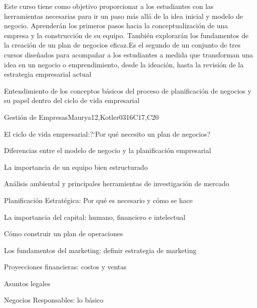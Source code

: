 \begin{syllabus}


\begin{justification}
Este curso tiene como objetivo proporcionar a los estudiantes con las herramientas necesarias para ir un paso más allá de la idea inicial y modelo de negocio. Aprenderán los primeros pasos hacia la conceptualización de una empresa y la construcción de su equipo. También explorarán los fundamentos de la creación de un plan de negocios
eficaz.Es el segundo de un conjunto de tres cursos diseñados para acompañar a los estudiantes a medida que transforman una idea en un negocio o emprendimiento, desde la ideación, hasta la revisión de la estrategia empresarial actual
\end{justification}

\begin{goals}
\item Entendimiento de  los conceptos básicos del proceso de planificación de negocios y su papel dentro del ciclo de vida empresarial
\end{goals}

\begin{outcomes}
   \item {}
   \item {}
   \item {}
\end{outcomes}

\begin{competences}
    \item {}
    \item {}
    \item {}
\end{competences}

\begin{unit}{Gestión de Empresas}{}{Maurya12,Kotler03}{16}{C17,C20}
\begin{topics}
      \item El ciclo de vida empresarial:?`Por qué necesito un plan de negocios?
      \item Diferencias entre el modelo de negocio y la planificación empresarial
      \item La importancia de un equipo bien estructurado
      \item Análisis ambiental y principales herramientas de investigación de mercado
      \item Planificación Estratégica: Por qué es necesario y cómo se hace
      \item La importancia del capital: humano, financiero e intelectual
      \item Cómo construir un plan de operaciones
      \item Los fundamentos del marketing: definir estrategia de marketing
      \item Proyecciones financieras: costos y ventas
      \item Asuntos legales
      \item Negocios Responsables: lo básico
\end{topics}


\end{unit}
\end{syllabus}
